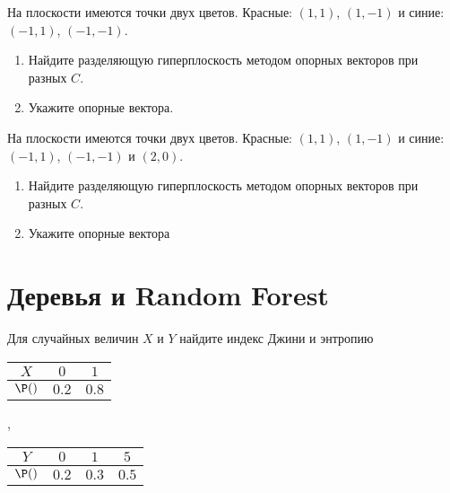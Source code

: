 \documentclass[pdftex,11pt,openany]{book}\usepackage[]{graphicx}\usepackage[]{color}
\begin{document}
\begin{problem}
На плоскости имеются точки двух цветов. Красные: $(1,1)$, $(1,-1)$ и синие: $(-1,1)$, $(-1,-1)$. 
\begin{enumerate}
\item Найдите разделяющую гиперплоскость методом опорных векторов при разных $C$. 
\item Укажите опорные вектора.
\end{enumerate}
 
\end{problem}

\begin{solution}
\end{solution}

\begin{problem}
На плоскости имеются точки двух цветов. Красные: $(1,1)$, $(1,-1)$ и синие: $(-1,1)$, $(-1,-1)$ и $(2,0)$. 
\begin{enumerate}
\item Найдите разделяющую гиперплоскость методом опорных векторов при разных $C$.
\item Укажите опорные вектора
\end{enumerate}
 
\end{problem}

\begin{solution}
\end{solution}

\chapter{Деревья и Random Forest}


\begin{problem}
Для случайных величин  $X$ и $Y$ найдите индекс Джини и энтропию


\begin{tabular}{ccc}
$X$ & $0$ & $1$ \\ 
\hline 
$\P()$ & $0.2$ & $0.8$ \\ 
\end{tabular},
\begin{tabular}{cccc}
$Y$ & $0$ & $1$ & $5$ \\ 
\hline 
$\P()$ & $0.2$ & $0.3$ & $0.5$ \\ 
\end{tabular} 
\end{problem}

\begin{solution}
\end{solution}
\end{document}
